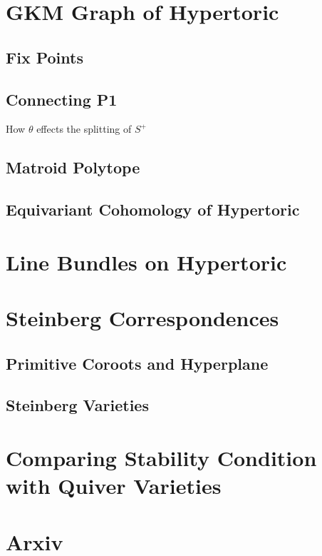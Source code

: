 \documentclass[b5paper]{article}
\begin{document}
\section{GKM Graph of Hypertoric}
\subsection{Fix Points}
\subsection{Connecting P1}
How $\theta$ effects the splitting of $S^+$
\subsection{Matroid Polytope}
\subsection{Equivariant Cohomology of Hypertoric}
\section{Line Bundles on Hypertoric}
\section{Steinberg Correspondences}
\subsection{Primitive Coroots and Hyperplane}
\subsection{Steinberg Varieties}

\section{Comparing Stability Condition with Quiver Varieties}
\section{Arxiv}
\end{document}

